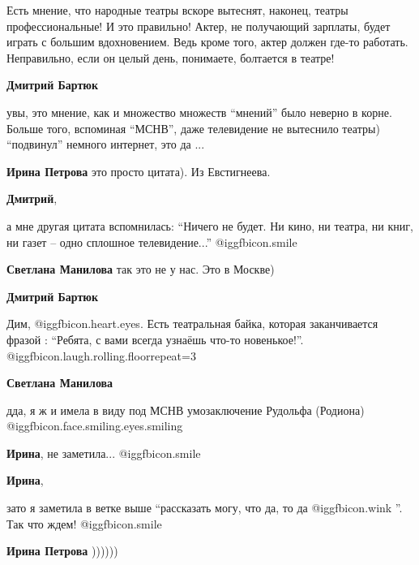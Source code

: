 \begin{itemize}
\begin{itemize}
\end{itemize} %


Есть мнение, что народные театры вскоре вытеснят, наконец, театры
профессиональные! И это правильно! Актер, не получающий зарплаты, будет играть
с большим вдохновением. Ведь кроме того, актер должен где-то работать.
Неправильно, если он целый день, понимаете, болтается в театре!

\begin{itemize} %
\textbf{Дмитрий Бартюк} 

увы, это мнение, как и множество множеств \enquote{мнений} было неверно в корне. Больше
того, вспоминая \enquote{МСНВ}, даже телевидение не вытеснило театры) \enquote{подвинул}
немного интернет, это да ...

\begin{itemize} %
\textbf{Ирина Петрова} это просто цитата). Из Евстигнеева.

\textbf{Дмитрий}, 

а мне другая цитата вспомнилась: \enquote{Ничего не будет. Ни кино, ни театра, ни книг,
ни газет – одно сплошное телевидение...} @igg{fbicon.smile} 


\textbf{Светлана Манилова} так это не у нас. Это в Москве)

\textbf{Дмитрий Бартюк} 

Дим,  @igg{fbicon.heart.eyes}. Есть театральная байка, которая заканчивается
фразой : \enquote{Ребята, с вами всегда узнаёшь что-то новенькое!}.
@igg{fbicon.laugh.rolling.floor}{repeat=3} 

\textbf{Светлана Манилова} 

дда, я ж и имела в виду под МСНВ умозаключение Рудольфа (Родиона)
@igg{fbicon.face.smiling.eyes.smiling} 

\textbf{Ирина}, не заметила... @igg{fbicon.smile} 

\textbf{Ирина}, 

зато я заметила в ветке выше \enquote{рассказать могу, что да, то да
@igg{fbicon.wink} }. Так что ждем! @igg{fbicon.smile} 

\textbf{Ирина Петрова} ))))))
\end{itemize} %

\end{itemize} %


\end{itemize}
